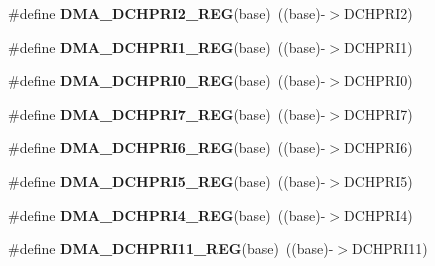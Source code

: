 \begin{DoxyCompactItemize}
\item 
\#define {\bfseries D\+M\+A\+\_\+\+D\+C\+H\+P\+R\+I2\+\_\+\+R\+EG}(base)~((base)-\/$>$D\+C\+H\+P\+R\+I2)\hypertarget{group__DMA__Register__Accessor__Macros_gae1b4c758a6fbb34e7eac26ce130107c9}{}\label{group__DMA__Register__Accessor__Macros_gae1b4c758a6fbb34e7eac26ce130107c9}

\item 
\#define {\bfseries D\+M\+A\+\_\+\+D\+C\+H\+P\+R\+I1\+\_\+\+R\+EG}(base)~((base)-\/$>$D\+C\+H\+P\+R\+I1)\hypertarget{group__DMA__Register__Accessor__Macros_ga9918ca0b50c6a964c0f4228c84cf477a}{}\label{group__DMA__Register__Accessor__Macros_ga9918ca0b50c6a964c0f4228c84cf477a}

\item 
\#define {\bfseries D\+M\+A\+\_\+\+D\+C\+H\+P\+R\+I0\+\_\+\+R\+EG}(base)~((base)-\/$>$D\+C\+H\+P\+R\+I0)\hypertarget{group__DMA__Register__Accessor__Macros_ga17996564e21436bae440bb781b62fc01}{}\label{group__DMA__Register__Accessor__Macros_ga17996564e21436bae440bb781b62fc01}

\item 
\#define {\bfseries D\+M\+A\+\_\+\+D\+C\+H\+P\+R\+I7\+\_\+\+R\+EG}(base)~((base)-\/$>$D\+C\+H\+P\+R\+I7)\hypertarget{group__DMA__Register__Accessor__Macros_ga540cf71e563a3d9d3dc0970180446af1}{}\label{group__DMA__Register__Accessor__Macros_ga540cf71e563a3d9d3dc0970180446af1}

\item 
\#define {\bfseries D\+M\+A\+\_\+\+D\+C\+H\+P\+R\+I6\+\_\+\+R\+EG}(base)~((base)-\/$>$D\+C\+H\+P\+R\+I6)\hypertarget{group__DMA__Register__Accessor__Macros_gadf0f16c0482d6d150b387594d51bf4d9}{}\label{group__DMA__Register__Accessor__Macros_gadf0f16c0482d6d150b387594d51bf4d9}

\item 
\#define {\bfseries D\+M\+A\+\_\+\+D\+C\+H\+P\+R\+I5\+\_\+\+R\+EG}(base)~((base)-\/$>$D\+C\+H\+P\+R\+I5)\hypertarget{group__DMA__Register__Accessor__Macros_ga3373d6ba11904a8d56852f1f8364eb10}{}\label{group__DMA__Register__Accessor__Macros_ga3373d6ba11904a8d56852f1f8364eb10}

\item 
\#define {\bfseries D\+M\+A\+\_\+\+D\+C\+H\+P\+R\+I4\+\_\+\+R\+EG}(base)~((base)-\/$>$D\+C\+H\+P\+R\+I4)\hypertarget{group__DMA__Register__Accessor__Macros_ga21ab8bc143d570cabf1b6ae2b572c8ec}{}\label{group__DMA__Register__Accessor__Macros_ga21ab8bc143d570cabf1b6ae2b572c8ec}

\item 
\#define {\bfseries D\+M\+A\+\_\+\+D\+C\+H\+P\+R\+I11\+\_\+\+R\+EG}(base)~((base)-\/$>$D\+C\+H\+P\+R\+I11)\hypertarget{group__DMA__Register__Accessor__Macros_gaa5261c483b946c45d7ed9fdf47b1a34f}{}\label{group__DMA__Register__Accessor__Macros_gaa5261c483b946c45d7ed9fdf47b1a34f}


\end{DoxyCompactItemize}
